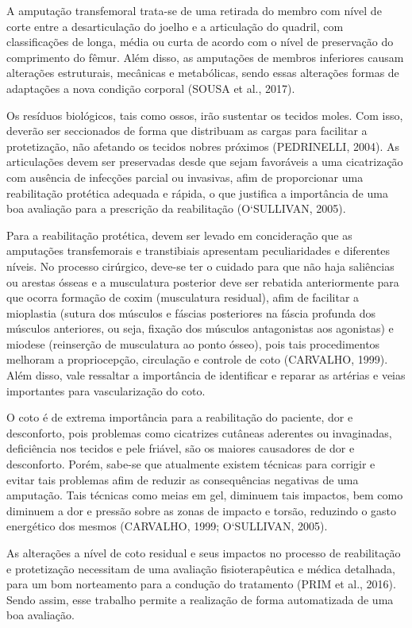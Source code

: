     A amputação transfemoral trata-se de uma retirada do membro com nível de corte entre a desarticulação do joelho e a articulação do quadril, com classificações de longa, média ou curta de acordo com o nível de preservação do comprimento do fêmur. Além disso, as amputações de membros inferiores causam alterações estruturais, mecânicas e metabólicas, sendo essas alterações formas de adaptações a nova condição corporal (SOUSA et al., 2017).

    Os resíduos biológicos, tais como ossos, irão sustentar os tecidos moles. Com isso, deverão ser seccionados de forma que distribuam as cargas para facilitar a protetização, não afetando os tecidos nobres próximos (PEDRINELLI, 2004). As articulações devem ser preservadas desde que sejam favoráveis a uma cicatrização com ausência de infecções parcial ou invasivas, afim de proporcionar uma reabilitação protética adequada e rápida, o que justifica a importância de uma boa avaliação para a prescrição da reabilitação (O‘SULLIVAN, 2005).

    Para a reabilitação protética, devem ser levado em concideração que as amputações transfemorais e transtibiais apresentam peculiaridades e diferentes níveis. No processo cirúrgico, deve-se ter o cuidado para que não haja saliências ou arestas ósseas e a musculatura posterior deve ser rebatida anteriormente para que ocorra formação de coxim (musculatura residual), afim de facilitar a mioplastia (sutura dos músculos e fáscias posteriores na fáscia profunda dos músculos anteriores, ou seja, fixação dos músculos antagonistas aos agonistas) e miodese (reinserção de musculatura ao ponto ósseo), pois tais procedimentos melhoram a propriocepção, circulação e controle de coto (CARVALHO, 1999). Além disso, vale ressaltar a importância de identificar e reparar as artérias e veias importantes para vascularização do coto.

    O coto é de extrema importância para a reabilitação do paciente, dor e desconforto, pois problemas como cicatrizes cutâneas aderentes ou invaginadas, deficiência nos tecidos e pele friável, são os maiores causadores de dor e desconforto. Porém, sabe-se que atualmente existem técnicas para corrigir e evitar tais problemas afim de reduzir as consequências negativas de uma amputação. Tais técnicas como meias em gel, diminuem tais impactos, bem como diminuem a dor e pressão sobre as zonas de impacto e torsão, reduzindo o gasto energético dos mesmos (CARVALHO, 1999; O‘SULLIVAN, 2005).

    As alterações a nível de coto residual e seus impactos no processo de reabilitação e protetização necessitam de uma avaliação fisioterapêutica e médica detalhada, para um bom norteamento para a condução do tratamento (PRIM et al., 2016). Sendo assim, esse trabalho permite a realização de forma automatizada de uma boa avaliação.
